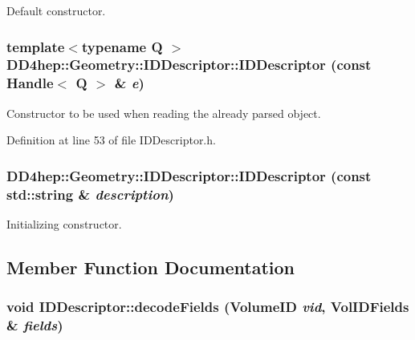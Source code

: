 Default constructor. \hypertarget{class_d_d4hep_1_1_geometry_1_1_i_d_descriptor_a74bad6296ac351ec41a75fe7e7c9eb7f}{
\subsubsection[{IDDescriptor}]{\setlength{\rightskip}{0pt plus 5cm}template$<$typename Q $>$ DD4hep::Geometry::IDDescriptor::IDDescriptor (const {\bf Handle}$<$ Q $>$ \& {\em e})}}
\label{class_d_d4hep_1_1_geometry_1_1_i_d_descriptor_a74bad6296ac351ec41a75fe7e7c9eb7f}


Constructor to be used when reading the already parsed object. 

Definition at line 53 of file IDDescriptor.h.\hypertarget{class_d_d4hep_1_1_geometry_1_1_i_d_descriptor_ac4736ad94f2d1ccd1a2481cd1af3c833}{
\subsubsection[{IDDescriptor}]{\setlength{\rightskip}{0pt plus 5cm}DD4hep::Geometry::IDDescriptor::IDDescriptor (const std::string \& {\em description})}}
\label{class_d_d4hep_1_1_geometry_1_1_i_d_descriptor_ac4736ad94f2d1ccd1a2481cd1af3c833}


Initializing constructor. 

\subsection{Member Function Documentation}
\hypertarget{class_d_d4hep_1_1_geometry_1_1_i_d_descriptor_ad946d0b1977723b917f4092cf039235c}{
\subsubsection[{decodeFields}]{\setlength{\rightskip}{0pt plus 5cm}void IDDescriptor::decodeFields (VolumeID {\em vid}, \/  {\bf VolIDFields} \& {\em fields})}}
\label{class_d_d4hep_1_1_geometry_1_1_i_d_descriptor_ad946d0b1977723b917f4092cf039235c}


